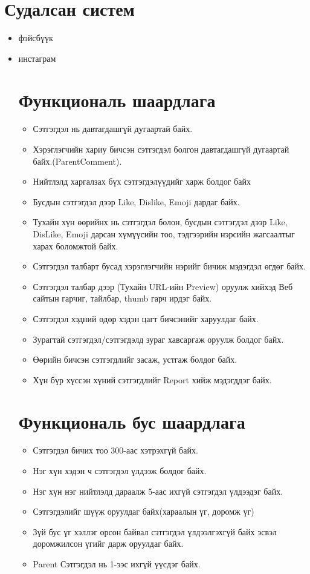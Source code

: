 \documentclass[12pt]{article}
\begin{document}
   	\section{Судалсан систем}
   	\begin{itemize}
   		\item фэйсбүүк
   		\item инстаграм
   		\section{Функциональ шаардлага}	
   		\begin{itemize}
   			\item Сэтгэгдэл нь давтагдашгүй дугаартай байх.
   			\item Хэрэглэгчийн хариу бичсэн сэтгэгдэл болгон давтагдашгүй дугаартай байх.(ParentComment).
   			\item Нийтлэлд харгалзах бүх сэтгэгдэлүүдийг харж болдог байх
   			\item Бусдын сэтгэгдэл дээр Like, Dislike, Emoji дардаг байх.
   			\item Тухайн хүн өөрийнх нь сэтгэгдэл болон, бусдын сэтгэгдэл дээр Like, DisLike, Emoji дарсан хүмүүсийн тоо, тэдгээрийн нэрсийн жагсаалтыг харах боломжтой байх.
   			\item Сэтгэгдэл талбарт бусад хэрэглэгчийн нэрийг бичиж мэдэгдэл өгдөг байх. 
   			\item Сэтгэгдэл талбар дээр (Тухайн URL-ийн Preview) оруулж хийхэд Веб сайтын гарчиг, тайлбар, thumb гарч ирдэг байх.
   			\item Сэтгэгдэл хэдний өдөр хэдэн цагт бичсэнийг харуулдаг байх.
   			\item Зурагтай сэтгэгдэл/сэтгэгдэлд зураг хавсаргаж оруулж болдог байх.
   			\item Өөрийн бичсэн сэтгэгдлийг засаж, устгаж болдог байх.
   			\item Хүн бүр хүссэн хүний сэтгэгдлийг Report хийж мэдэгддэг байх.
   		\end{itemize}
   	
   	
   	
   		\section{Функциональ бус шаардлага}
      	\begin{itemize}
   		\item Сэтгэгдэл бичих тоо 300-аас хэтрэхгүй байх.
   		\item Нэг хүн хэдэн ч сэтгэгдэл үлдээж болдог байх.
   		\item Нэг хүн нэг нийтлэлд дараалж 5-аас ихгүй сэтгэгдэл үлдээдэг байх.
   		\item Сэтгэгдэлийг шүүж оруулдаг байх(хараалын үг, доромж үг)
   		\item Зүй бус үг хэллэг орсон байвал сэтгэгдэл үлдээлгэхгүй байх эсвэл доромжилсон үгийг дарж оруулдаг байх.
   		\item Parent Сэтгэгдэл нь 1-ээс ихгүй үүсдэг байх.
     	\end{itemize}
   	    \end{itemize}
       
\end{document}
